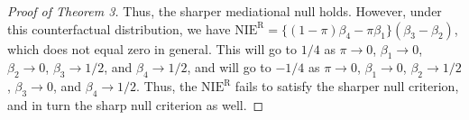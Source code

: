 \documentclass[12pt]{article}
\begin{document}
\begin{proof}[Proof of Theorem 3]
\begin{comment}
    When $M(a)=1$, we have
    \begin{align*}
        Y\{a,M(a^*)\} =& Y(a,0)\{1-M(a^*)\} + Y(a,1)M(a^*)\\
        =& Y(a,0)\{1-Y(a,0)Y(a,1)-\lvert Y(a,1)-Y(a,0)\rvert\}\\ 
        &+ Y(a,1)\{Y(a,0)Y(a,1) + \lvert Y(a,1)-Y(a,0)\rvert\}\\
        =& Y(a,0) - Y(a,0)Y(a,1) + Y(a,0)Y(a,1)\\ 
        &+ \{Y(a,1)-Y(a,0)\}\{Y(a,0) + Y(a,1) - 2Y(a,0)Y(a,1)\}\\
        =& Y(a,0) + Y(a,0)Y(a,1) + Y(a,1) - 2Y(a,0)Y(a,1)\\ 
        &- Y(a,0) - Y(a,0)Y(a,1) + 2Y(a,0)Y(a,1)\\
        =& Y\{a,M(a)\}.
    \end{align*}
\end{comment}
    Thus, the sharper mediational null holds. However, under this counterfactual distribution, we have %
    $\text{NIE}^{\text{R}} = \{(1-\pi)\beta_4 - \pi\beta_1\}(\beta_3 - \beta_2)$, which does not equal zero in general. This will go to $1/4$ as $\pi\rightarrow 0$, $\beta_1\rightarrow 0$, $\beta_2\rightarrow 0$, $\beta_3\rightarrow 1/2$, and $\beta_4\rightarrow 1/2$, and will go to $-1/4$ as $\pi\rightarrow 0$, $\beta_1\rightarrow 0$, $\beta_2\rightarrow 1/2$, $\beta_3\rightarrow 0$, and $\beta_4\rightarrow 1/2$. Thus, the $\text{NIE}^{\text{R}}$ fails to satisfy the sharper null criterion, and in turn the sharp null criterion as well.
\end{proof}
\end{document}
